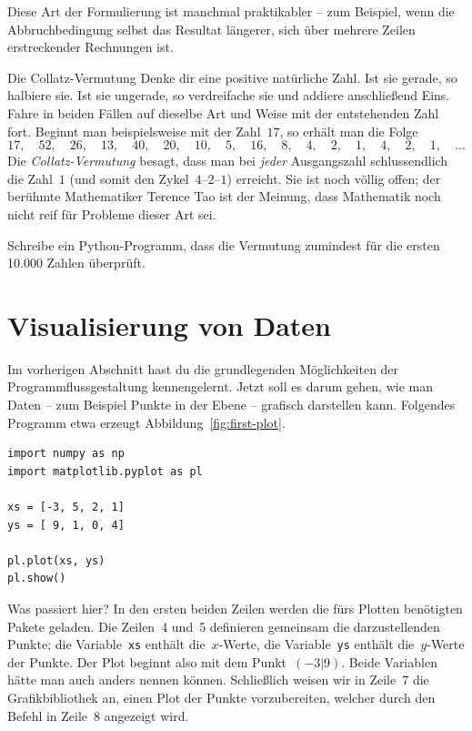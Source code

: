 \documentclass{blatt}
\begin{document}
Diese Art der Formulierung ist manchmal praktikabler -- zum Beispiel, wenn die
Abbruchbedingung selbst das Resultat längerer, sich über mehrere Zeilen
erstreckender Rechnungen ist.

\begin{aufgabe}{Die Collatz-Vermutung}
Denke dir eine positive natürliche Zahl. Ist sie gerade, so halbiere sie. Ist
sie ungerade, so verdreifache sie und addiere anschließend Eins. Fahre in
beiden Fällen auf dieselbe Art und Weise mit der entstehenden Zahl fort.
Beginnt man beispielsweise mit der Zahl~$17$, so erhält man die Folge
\[ 17,\quad52,\quad26,\quad13,\quad40,\quad20,\quad10,\quad5,\quad16,\quad8,\quad4,\quad2,\quad1,\quad4,\quad2,\quad1,\quad\ldots \]
Die \emph{Collatz-Vermutung} besagt, dass man bei \emph{jeder} Ausgangszahl
schlussendlich die Zahl~$1$ (und somit den Zykel~$4$--$2$--$1$) erreicht. Sie
ist noch völlig offen; der berühmte Mathematiker Terence Tao ist der Meinung,
dass Mathematik noch nicht reif für Probleme dieser Art sei.

Schreibe ein Python-Programm, dass die Vermutung zumindest für die ersten
10.000 Zahlen überprüft.
\end{aufgabe}


\section{Visualisierung von Daten}

Im vorherigen Abschnitt hast du die grundlegenden Möglichkeiten der
Programmflussgestaltung kennengelernt. Jetzt soll es darum gehen, wie man Daten
-- zum Beispiel Punkte in der Ebene -- grafisch darstellen kann. Folgendes
Programm etwa erzeugt Abbildung~\ref{fig:first-plot}.

\begin{verbatim}
import numpy as np
import matplotlib.pyplot as pl

xs = [-3, 5, 2, 1]
ys = [ 9, 1, 0, 4]

pl.plot(xs, ys)
pl.show()
\end{verbatim}

Was passiert hier? In den ersten beiden Zeilen werden die fürs Plotten
benötigten Pakete geladen. Die Zeilen~4 und~5 definieren gemeinsam die
darzustellenden Punkte; die Variable~\texttt{xs} enthält
die~$x$-Werte, die Variable~\texttt{ys} enthält die~$y$-Werte der
Punkte. Der Plot beginnt also mit dem Punkt~$(-3|9)$. Beide Variablen hätte man
auch anders nennen können. Schließlich weisen wir in Zeile~7 die
Grafikbibliothek an, einen Plot der Punkte vorzubereiten, welcher durch den
Befehl in Zeile~8 angezeigt wird.
\end{document}
